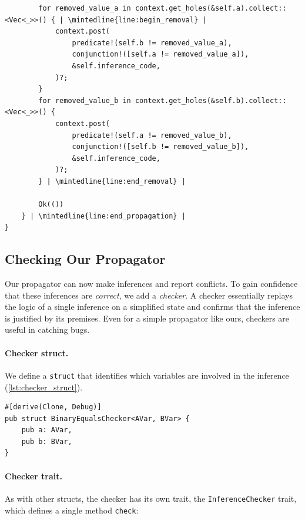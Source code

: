 \documentclass{article}
\begin{document}
\begin{listing}[H]
\begin{verbatim}
        for removed_value_a in context.get_holes(&self.a).collect::<Vec<_>>() { | \mintedline{line:begin_removal} |
            context.post(
                predicate!(self.b != removed_value_a), 
                conjunction!([self.a != removed_value_a]), 
                &self.inference_code,
            )?;
        }
        for removed_value_b in context.get_holes(&self.b).collect::<Vec<_>>() {
            context.post(
                predicate!(self.a != removed_value_b),
                conjunction!([self.b != removed_value_b]),
                &self.inference_code,
            )?;
        } | \mintedline{line:end_removal} |

        Ok(())
    } | \mintedline{line:end_propagation} |
}
    \end{verbatim}
    \caption{Our \texttt{Propagator} implementation}
    \label{lst:propagator_impl}
\end{listing}

\subsection{Checking Our Propagator}

Our propagator can now make inferences and report conflicts. 
To gain confidence that these inferences are \emph{correct}, we add a \emph{checker}. 
A checker essentially replays the logic of a single inference on a simplified state and confirms that the inference is justified by its premises.
Even for a simple propagator like ours, checkers are useful in catching bugs.

\paragraph{Checker struct.}
We define a \texttt{struct} that identifies which variables are involved in the inference (\autoref{lst:checker_struct}).

\begin{listing}[H]
\begin{verbatim}
#[derive(Clone, Debug)]
pub struct BinaryEqualsChecker<AVar, BVar> {
    pub a: AVar,
    pub b: BVar,
}
\end{verbatim}
\caption{The \texttt{BinaryEqualsChecker} struct}
\label{lst:checker_struct}
\end{listing}

\paragraph{Checker trait.} As with other structs, the checker has its own trait, the \texttt{InferenceChecker} trait, which defines a single method \texttt{check}:
\end{document}
